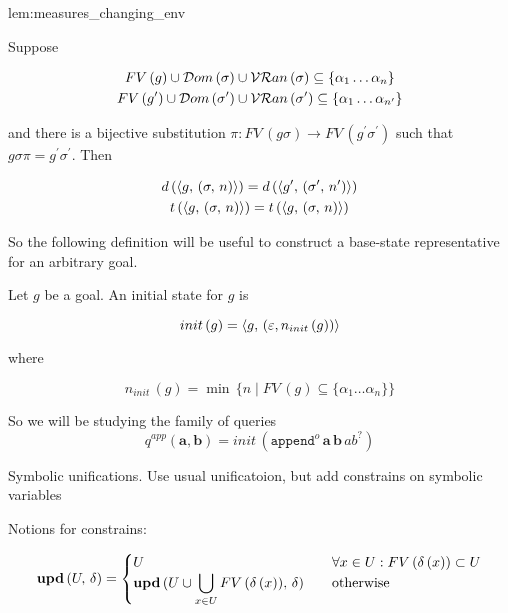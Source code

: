 \begin{replemma}{lem:measures_changing_env}

  Suppose

  \vskip-2mm\begin{gather*}
      FV\,(g) \cup \mathcal{D}om\,(\sigma) \cup \mathcal{VR}an\,(\sigma) \subseteq \{ \alpha_1\dots\alpha_n \} \\
      FV\,(g^\prime) \cup \mathcal{D}om\,(\sigma^\prime) \cup \mathcal{VR}an\,(\sigma^\prime) \subseteq \{ \alpha_1\dots \alpha_{n^\prime} \}
    \end{gather*}
  
  and there is a bijective substitution $\pi \colon FV\,(g \sigma) \to FV\,(g^\prime \sigma^\prime)$ such that $g \sigma \pi = g^\prime \sigma^\prime$. Then

  \vskip-3mm\begin{gather*}
    d\,(\langle g ,\, (\sigma ,\, n) \rangle) = d\,(\langle g^\prime ,\, (\sigma^\prime ,\, n^\prime) \rangle)\\
    t\,(\langle g ,\, (\sigma ,\, n) \rangle) = t\,(\langle g ,\, (\sigma ,\, n) \rangle)
  \end{gather*}

\end{replemma}

So the following definition will be useful to construct a base-state representative for an arbitrary goal.

\begin{definition} Let $g$ be a goal. An initial state for $g$ is

  \[
   init\,(g)=\langle g ,\, (\varepsilon, n_{init}\,(g)) \rangle
  \]

  where
  
  \[ n_{init}\,(g) = \min\, \{ n \mid FV\,(g) \subseteq \{ \alpha_1\dots\alpha_n \} \} \]
\end{definition}

So we will be studying the family of queries \[ q^{app}(\mathbf{a}, \mathbf{b}) = init\,(\texttt{append$^o$} \, \mathbf{a} \, \mathbf{b} \, ab^?) \]

\colorbox{blue!20}{\parbox{\textwidth}{Symbolic unifications. Use usual unificatoion, but add constrains on symbolic variables}}

Notions for constrains:

\[
\mbox{\textbf{upd}}\,(U,\, \delta) = \begin{cases}
                           U & \quad\forall x \in U : FV\,(\delta\,(x)) \subset U \\
                           \mbox{\textbf{upd}}\,(U \cup \displaystyle\bigcup\limits_{x \in U} FV\,(\delta\,(x)),\, \delta) & \quad\mbox{otherwise}
                          \end{cases}
\]

